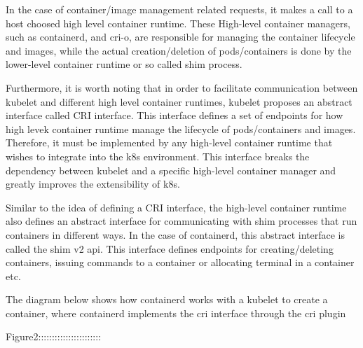     In the case of container/image management related requests, it makes a call to a host choosed high level container runtime.
    These High-level container managers, such as containerd, and cri-o, are responsible for managing the container lifecycle and images, while the actual creation/deletion of pods/containers is done by the lower-level container runtime or so called shim process.

    Furthermore, it is worth noting that in order to facilitate communication between kubelet and different high level container runtimes, kubelet proposes an abstract interface called CRI interface. This interface defines a set 
    of endpoints for how high levek container runtime manage the lifecycle of pods/containers and images. Therefore, it must be implemented by any high-level container runtime that wishes to integrate into the k8s environment. This interface breaks the dependency between kubelet 
    and a specific high-level container manager and greatly improves the extensibility of k8s.
    
    Similar to the idea of defining a CRI interface, the high-level container runtime also defines an abstract interface for communicating with shim processes that run containers in different ways. In the case of containerd, this abstract interface is called the shim v2 api. 
    This interface defines endpoints for creating/deleting containers, issuing commands to a container or allocating terminal in a container etc.




    The diagram below shows how containerd works with a kubelet to create a container, where containerd implements the cri interface through the cri plugin

    Figure2:::::::::::::::::::::::

